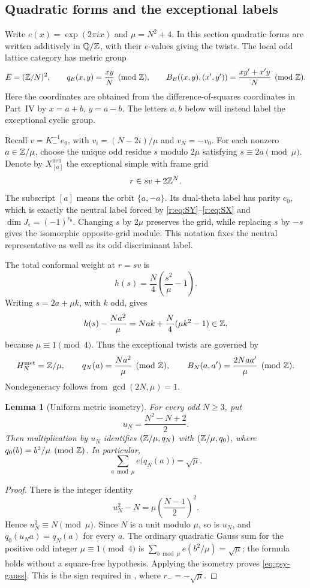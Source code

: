 \documentclass[11pt,a4paper]{article}
\numberwithin{equation}{section}
\newtheorem{lemma}[theorem]{Lemma}
\theoremstyle{definition}\newtheorem{definition}[theorem]{Definition}
\theoremstyle{remark}\newtheorem{remark}[theorem]{Remark}
\begin{document}
\subsection{Quadratic forms and the exceptional labels}

Write $e(x)=\exp(2\pi ix)$ and $\mu=N^2+4$. In this section
quadratic forms are written additively in $\mathbb Q/\mathbb Z$, with their
$e$-values giving the twists. The local odd lattice category has metric group
\[
 E=(\mathbb Z/N)^2,\qquad q_E(x,y)=\frac{xy}{N}\pmod{\mathbb Z},
 \qquad B_E((x,y),(x',y'))=\frac{xy'+x'y}{N}\pmod{\mathbb Z}.
\]
Here the coordinates are obtained from the difference-of-squares
coordinates in Part~IV by $x=a+b$, $y=a-b$. The letters $a,b$
below will instead label the exceptional cyclic group.

Recall $v=K_-^{-1}e_0$, with $v_i=(N-2i)/\mu$ and $v_N=-v_0$.
For each nonzero $a\in\mathbb Z/\mu$, choose the unique odd residue $s$
modulo $2\mu$ satisfying $s\equiv2a\pmod\mu$. Denote by
$X^{\mathrm{neu}}_{[a]}$ the exceptional simple with frame grid
\[
                  r\in sv+2\mathbb Z^N.
\]
The subscript $[a]$ means the orbit $\{a,-a\}$. Its dual-theta
label has parity $e_0$, which is exactly the neutral label forced by
\eqref{r:eq:SY}--\eqref{r:eq:SX} and $\dim J_\epsilon=(-1)^{\epsilon_0}$.
Changing $s$ by $2\mu$ preserves the grid, while replacing $s$ by
$-s$ gives the isomorphic opposite-grid module. This notation fixes
the neutral representative as well as its odd discriminant label.

The total conformal weight at $r=sv$ is
\[
             h(s)=\frac N4\left(\frac{s^2}{\mu}-1\right).
\]
Writing $s=2a+\mu k$, with $k$ odd, gives
\[
 h(s)-\frac{Na^2}{\mu}
       =Nak+\frac N4(\mu k^2-1)\in\mathbb Z,
\]
because $\mu\equiv1\pmod4$. Thus the exceptional twists are governed by
\begin{equation}\label{eq:gsy-natural-form}
 H_N^{\mathrm{met}}=\mathbb Z/\mu,\qquad
 q_N(a)=\frac{Na^2}{\mu}\pmod{\mathbb Z},\qquad
 B_N(a,a')=\frac{2Naa'}{\mu}\pmod{\mathbb Z}.
\end{equation}
Nondegeneracy follows from $\gcd(2N,\mu)=1$.

\begin{lemma}[Uniform metric isometry]\label{lem:gsy-isometry}
For every odd $N\geq3$, put
\[
 u_N=\frac{N^2-N+2}{2}.
\]
Then multiplication by $u_N$ identifies
$(\mathbb Z/\mu,q_N)$ with $(\mathbb Z/\mu,q_0)$, where
$q_0(b)=b^2/\mu\pmod{\mathbb Z}$. In particular,
\begin{equation}\label{eq:gsy-gauss}
 \sum_{a\bmod\mu}e\bigl(q_N(a)\bigr)=\sqrt\mu.
\end{equation}
\end{lemma}
\begin{proof}
There is the integer identity
\[
 u_N^2-N=\mu\left(\frac{N-1}{2}\right)^2.
\]
Hence $u_N^2\equiv N\pmod\mu$. Since $N$ is a unit modulo $\mu$,
so is $u_N$, and $q_0(u_Na)=q_N(a)$ for every $a$.
The ordinary quadratic Gauss sum for the positive odd integer
$\mu\equiv1\pmod4$ is
$\sum_{b\bmod\mu}e(b^2/\mu)=\sqrt\mu$; the formula holds without
a square-free hypothesis. Applying the isometry proves
\eqref{eq:gsy-gauss}. This is the sign required in
\cite[Theorem 5.1]{gsy}, where $r_-=-\sqrt\mu$.
\end{proof}
\end{document}

